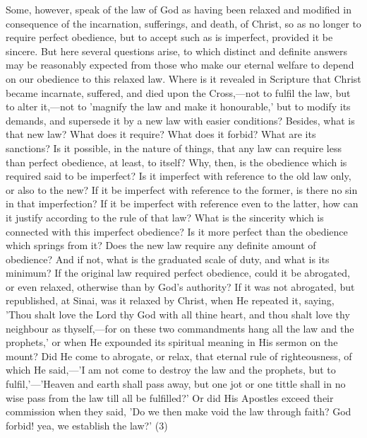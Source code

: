 \documentclass[
]{book}
\begin{document}
Some, however, speak of the law of God as having been relaxed and modified in consequence of the incarnation, sufferings, and death, of Christ, so as no longer to require perfect obedience, but to accept such as is imperfect, provided it be sincere. But here several questions arise, to which distinct and definite answers may be reasonably expected from those who make our eternal welfare to depend on our obedience to this relaxed law. Where is it revealed in Scripture that Christ became incarnate, suffered, and died upon the Cross,---not to fulfil the law, but to alter it,---not to 'magnify the law and make it honourable,' but to modify its demands, and supersede it by a new law with easier conditions? Besides, what is that new law? What does it require? What does it forbid? What are its sanctions? Is it possible, in the nature of things, that any law can require less than perfect obedience, at least, to itself? Why, then, is the obedience which is required said to be imperfect? Is it imperfect with reference to the old law only, or also to the new? If it be imperfect with reference to the former, is there no sin in that imperfection? If it be imperfect with reference even to the latter, how can it justify according to the rule of that law? What is the sincerity which is connected with this imperfect obedience? Is it more perfect than the obedience which springs from it? Does the new law require any definite amount of obedience? And if not, what is the graduated scale of duty, and what is its minimum? If the original law required perfect obedience, could it be abrogated, or even relaxed, otherwise than by God's authority? If it was not abrogated, but republished, at Sinai, was it relaxed by Christ, when He repeated it, saying, 'Thou shalt love the Lord thy God with all thine heart, and thou shalt love thy neighbour as thyself,---for on these two commandments hang all the law and the prophets,' or when He expounded its spiritual meaning in His sermon on the mount? Did He come to abrogate, or relax, that eternal rule of righteousness, of which He said,---'I am not come to destroy the law and the prophets, but to fulfil,'---'Heaven and earth shall pass away, but one jot or one tittle shall in no wise pass from the law till all be fulfilled?' Or did His Apostles exceed their commission when they said, 'Do we then make void the law through faith? God forbid! yea, we establish the law?' (3)
\end{document}
